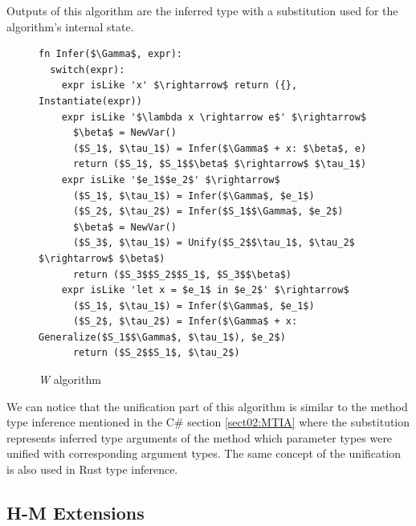 Outputs of this algorithm are the inferred type with a substitution used for the algorithm's internal state. 
\begin{figure}
\begin{lstlisting}[style=myAlgo, mathescape=true]
fn Infer($\Gamma$, expr):
  switch(expr):
    expr isLike 'x' $\rightarrow$ return ({}, Instantiate(expr))
    expr isLike '$\lambda x \rightarrow e$' $\rightarrow$
      $\beta$ = NewVar()
      ($S_1$, $\tau_1$) = Infer($\Gamma$ + x: $\beta$, e)
      return ($S_1$, $S_1$$\beta$ $\rightarrow$ $\tau_1$)
    expr isLike '$e_1$$e_2$' $\rightarrow$
      ($S_1$, $\tau_1$) = Infer($\Gamma$, $e_1$)
      ($S_2$, $\tau_2$) = Infer($S_1$$\Gamma$, $e_2$)
      $\beta$ = NewVar()
      ($S_3$, $\tau_1$) = Unify($S_2$$\tau_1$, $\tau_2$ $\rightarrow$ $\beta$)
      return ($S_3$$S_2$$S_1$, $S_3$$\beta$)
    expr isLike 'let x = $e_1$ in $e_2$' $\rightarrow$
      ($S_1$, $\tau_1$) = Infer($\Gamma$, $e_1$)
      ($S_2$, $\tau_2$) = Infer($\Gamma$ + x: Generalize($S_1$$\Gamma$, $\tau_1$), $e_2$)
      return ($S_2$$S_1$, $\tau_2$)
\end{lstlisting}
\caption{\textit{W} algorithm}
\label{img16:w}
\end{figure}
\par
We can notice that the unification part of this algorithm is similar to the method type inference mentioned in the C\# section \ref{sect02:MTIA} where the substitution represents inferred type arguments of the method which parameter types were unified with corresponding argument types.
The same concept of the unification is also used in Rust type inference.

\newpage

\subsection{H-M Extensions}

